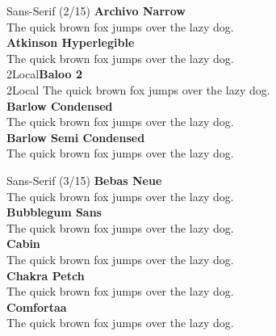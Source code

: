 \documentclass[10pt]{beamer}
\begin{document}
\begin{frame}{Sans-Serif (2/15)}
\vspace{-0.2cm}
  {\ArchivoNarrowLocal\Large\bfseries Archivo Narrow\\}
  {\ArchivoNarrowLocal The quick brown fox jumps over the lazy dog.\\[0.3cm]}
  {\AtkinsonHyperlegibleLocal\Large\bfseries Atkinson Hyperlegible\\}
  {\AtkinsonHyperlegibleLocal The quick brown fox jumps over the lazy dog.\\[0.3cm]}
  {\Baloo2Local\Large\bfseries Baloo 2\\}
  {\Baloo2Local The quick brown fox jumps over the lazy dog.\\[0.3cm]}
  {\BarlowCondensedLocal\Large\bfseries Barlow Condensed\\}
  {\BarlowCondensedLocal The quick brown fox jumps over the lazy dog.\\[0.3cm]}
  {\BarlowSemiCondensedLocal\Large\bfseries Barlow Semi Condensed\\}
  {\BarlowSemiCondensedLocal The quick brown fox jumps over the lazy dog.\\[0.3cm]}
\end{frame}

\begin{frame}{Sans-Serif (3/15)}
\vspace{-0.2cm}
  {\BebasNeueLocal\Large\bfseries Bebas Neue\\}
  {\BebasNeueLocal The quick brown fox jumps over the lazy dog.\\[0.3cm]}
  {\BubblegumSansLocal\Large\bfseries Bubblegum Sans\\}
  {\BubblegumSansLocal The quick brown fox jumps over the lazy dog.\\[0.3cm]}
  {\CabinLocal\Large\bfseries Cabin\\}
  {\CabinLocal The quick brown fox jumps over the lazy dog.\\[0.3cm]}
  {\ChakraPetchLocal\Large\bfseries Chakra Petch\\}
  {\ChakraPetchLocal The quick brown fox jumps over the lazy dog.\\[0.3cm]}
  {\ComfortaaLocal\Large\bfseries Comfortaa\\}
  {\ComfortaaLocal The quick brown fox jumps over the lazy dog.\\[0.3cm]}
\end{frame}
\end{document}
